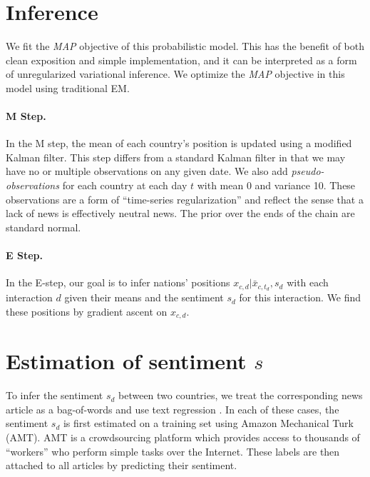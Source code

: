 
\section{Inference}
We fit the \emph{MAP} objective of this probabilistic model.  This has
the benefit of both clean exposition and simple implementation, and it
can be interpreted as a form of unregularized variational inference.
We optimize the \emph{MAP} objective in this model using traditional
EM.

\paragraph{M Step.} In the M step, the mean of each country's position
is updated using a modified Kalman filter.  This step differs from a
standard Kalman filter in that we may have no or multiple observations
on any given date.  We also add \emph{pseudo-observations} for each
country at each day $t$ with mean 0 and variance 10.  These
observations are a form of ``time-series regularization'' and reflect
the sense that a lack of news is effectively neutral news. The prior
over the ends of the chain are standard normal.

\paragraph{E Step.} In the E-step, our goal is to infer nations'
positions $x_{c,d} | \bar{x}_{c,t_d}, s_d$ with each interaction $d$ given
their means and the sentiment $s_d$ for this interaction.  We find
these positions by gradient ascent on $x_{c,d}$.

\section{Estimation of sentiment $s$}
\label{section:sentiment_models}
To infer the sentiment $s_d$ between two countries, we treat the
corresponding news article as a bag-of-words and use text regression
\cite{kogan:2009}.  In each of these cases, the sentiment $s_d$ is
first estimated on a training set using Amazon Mechanical Turk (AMT).
AMT is a crowdsourcing platform which provides access to thousands of
``workers'' who perform simple tasks over the Internet.  These labels
are then attached to all articles by predicting their sentiment.

